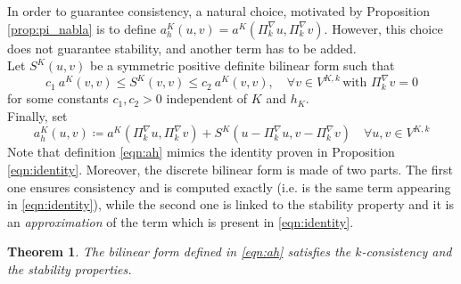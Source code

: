 \documentclass[10pt]{article}
\newtheorem{theorem}{Theorem}
\begin{document}
In order to guarantee consistency, a natural choice, motivated by Proposition \ref{prop:pi_nabla} is to define $a^K_h(u,v)=a^K(\Pi_k^\nabla u, \Pi_k^\nabla v)$. However, this choice does not guarantee stability, and another term has to be added. \\
Let $S^K(u,v)$ be a symmetric positive definite bilinear form such that
\begin{equation}
	c_1 \ a^K(v,v) \leq S^K(v,v) \leq c_2 \ a^K(v,v), \quad \forall v \in V^{K,k} \, \text{with } \Pi_k^\nabla v =0
	\label{eqn:Sk}
\end{equation}
for some constants $c_1,c_2>0$ independent of $K$ and $h_K$. \\
Finally, set
\begin{equation}
	a_h^K(u,v) \coloneqq a^K(\Pi_k^\nabla u, \Pi_k^\nabla v)+S^K(u-\Pi_k^\nabla u, v-\Pi_k^\nabla v) \quad \forall u,v \in V^{K,k}
	\label{eqn:ah}
\end{equation}
Note that definition \eqref{eqn:ah} mimics the identity proven in Proposition \eqref{eqn:identity}. Moreover, the discrete bilinear form is made of two parts. The first one ensures consistency and is computed exactly (i.e. is the same term appearing in \eqref{eqn:identity}), while the second one is linked to the stability property and it is an \textit{approximation} of the term which is present in \eqref{eqn:identity}. \\
\begin{theorem}
	The bilinear form defined in \eqref{eqn:ah} satisfies the $k$-consistency and the stability properties.
\end{theorem}
\end{document}
